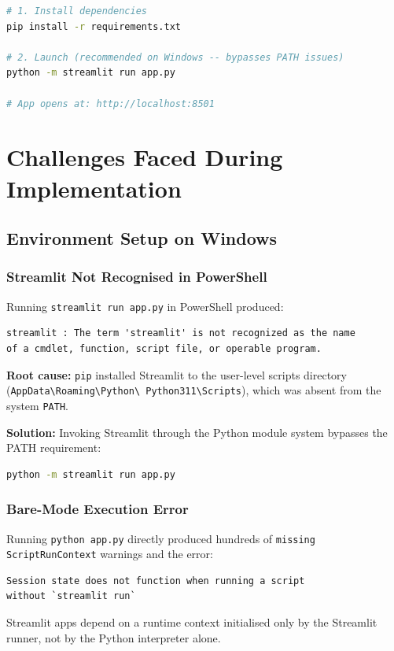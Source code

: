 \documentclass[12pt,a4paper]{article}
\begin{document}
\begin{lstlisting}[language=bash, caption={Installation and launch}]
# 1. Install dependencies
pip install -r requirements.txt

# 2. Launch (recommended on Windows -- bypasses PATH issues)
python -m streamlit run app.py

# App opens at: http://localhost:8501
\end{lstlisting}

\section{Challenges Faced During Implementation}

\subsection{Environment Setup on Windows}

\subsubsection{Streamlit Not Recognised in PowerShell}
Running \texttt{streamlit run app.py} in PowerShell produced:

\begin{lstlisting}
streamlit : The term 'streamlit' is not recognized as the name
of a cmdlet, function, script file, or operable program.
\end{lstlisting}

\textbf{Root cause:} \texttt{pip} installed Streamlit to the user-level scripts
directory (\texttt{AppData\textbackslash Roaming\textbackslash Python\textbackslash
Python311\textbackslash Scripts}), which was absent from the system \texttt{PATH}.

\textbf{Solution:} Invoking Streamlit through the Python module system bypasses
the PATH requirement:
\begin{lstlisting}[language=bash]
python -m streamlit run app.py
\end{lstlisting}

\subsubsection{Bare-Mode Execution Error}
Running \texttt{python app.py} directly produced hundreds of
\texttt{missing ScriptRunContext} warnings and the error:
\begin{lstlisting}
Session state does not function when running a script
without `streamlit run`
\end{lstlisting}
Streamlit apps depend on a runtime context initialised only by the Streamlit
runner, not by the Python interpreter alone.
\end{document}
